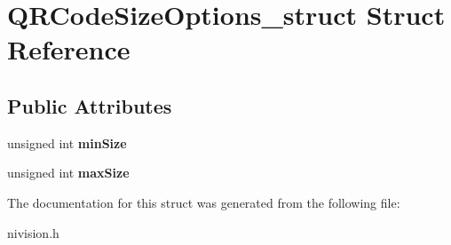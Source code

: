 \hypertarget{structQRCodeSizeOptions__struct}{
\section{QRCodeSizeOptions\_\-struct Struct Reference}
\label{structQRCodeSizeOptions__struct}
}
\subsection*{Public Attributes}
\begin{DoxyCompactItemize}
\item 
\hypertarget{structQRCodeSizeOptions__struct_ad092cdc368cf5cdfa3e61ac6b1adf22e}{
unsigned int {\bfseries minSize}}
\label{structQRCodeSizeOptions__struct_ad092cdc368cf5cdfa3e61ac6b1adf22e}

\item 
\hypertarget{structQRCodeSizeOptions__struct_a29986d1d14ef9387e3aa9b5843150116}{
unsigned int {\bfseries maxSize}}
\label{structQRCodeSizeOptions__struct_a29986d1d14ef9387e3aa9b5843150116}

\end{DoxyCompactItemize}


The documentation for this struct was generated from the following file:\begin{DoxyCompactItemize}
\item 
nivision.h\end{DoxyCompactItemize}
